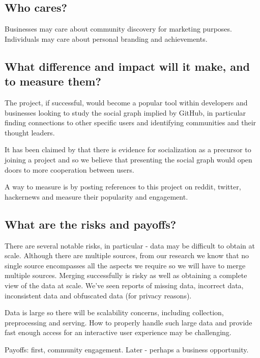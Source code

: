 \documentclass[sigconf,11pt]{acmart}
\begin{document}
\subsection*{Who cares?}
Businesses may care about community discovery for marketing purposes.
Individuals may care about personal branding and achievements.

\subsection*{What difference and impact will it make, and to measure them?}
The project, if successful, would become a popular tool within developers and businesses
looking to study the social graph implied by GitHub, in particular finding connections to other specific users
and identifying communities and their thought leaders.

It has been claimed by \citeauthor{developer-onboarding-github}\cite{developer-onboarding-github}
that there is evidence for socialization as a precursor to joining a project
and so we believe that presenting the social graph would open doors to more cooperation between users.

A way to measure is by posting references to this project on reddit, twitter, hackernews and measure their
popularity and engagement.

\subsection*{What are the risks and payoffs?}
There are several notable risks, in particular - data may be difficult to obtain at scale.
Although there are multiple sources, from our research we know that no single source encompasses all the aspects
we require so we will have to merge multiple sources.
Merging successfully is risky as well as obtaining a complete view of the data at scale.
We've seen reports of missing data, incorrect data, inconsistent data and obfuscated data (for privacy reasons)\cite{promises-and-perils-mining-github}.

Data is large so there will be scalability concerns, including collection, preprocessing and serving.
How to properly handle such large data and provide fast enough access for an interactive user experience may be challenging.

Payoffs: first, community engagement. Later - perhaps a business opportunity.
\end{document}
